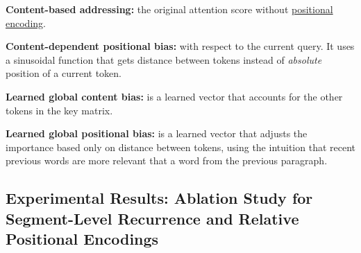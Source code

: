 \begin{enumerateSpaced}{3pt}
    \item \textbf{Content-based addressing: }the original attention score without \hyperref[sec:PosEncodings]{positional encoding}.
    
    \item \textbf{Content-dependent positional bias: }with respect to the current query. It uses a sinusoidal function that gets distance between tokens instead of \emph{absolute} position of a current token. 
    
    \item \textbf{Learned global content bias: } is a learned vector that accounts for the other tokens in the key matrix.
    
    \item \textbf{Learned global positional bias: }is a learned vector that adjusts the importance based only on distance between tokens, using the intuition that recent previous words are more relevant that a word from the previous paragraph. 
\end{enumerateSpaced}




\subsection{Experimental Results: Ablation Study for Segment-Level Recurrence and Relative Positional Encodings} \label{sec:ExpResultsTransXL}



